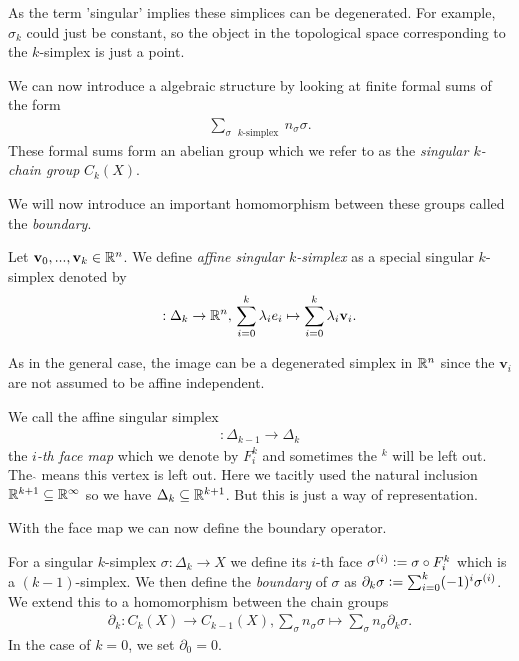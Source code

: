 \documentclass[../master_thesis.tex]{subfiles}
\begin{document}
As the term 'singular' implies these simplices can be degenerated. For example, $\sigma_k$ could 
just be constant, so the object in the topological space corresponding to the 
$k$-simplex is just a point.

We can now introduce a algebraic structure by looking at finite formal sums of the form 
\begin{align*}
    \sum_{\text{$\sigma$ $k$-simplex }} n_\sigma \sigma.
\end{align*}
These formal sums form an abelian group which we refer to as the 
\textit{singular $k$-chain group} $C_k(X)$. 

We will now introduce an important homomorphism between these groups called the \textit{boundary}.
\begin{definition}
    Let $\mathbf{v}_0, ... , \mathbf{v}_k \in \mathbb{R}^n$. 
    We define \textit{affine singular $k$-simplex} as a special singular $k$-simplex denoted by
    \begin{align*}
        [\mathbf{v}_0,...,\mathbf{v}_k]: \Delta_k \rightarrow \real^n, \, 
        \sum\limits_{i = 0}^k \lambda_i e_i \mapsto \sum\limits_{i = 0}^k \lambda_i \mathbf{v}_i.
    \end{align*}
\end{definition}
As in the general case, the image can be a degenerated simplex in $\mathbb{R}^n$ since the 
$\mathbf{v}_i$ are not assumed to be affine independent. 

We call the affine singular simplex 
\begin{align}
    [e_0,...,\hat{e}_i,...,e_k]: \Delta_{k-1} \rightarrow \Delta_k \label{eq:face_map}
\end{align}
the \textit{$i$-th face map} which we denote by $F^k_i$ and sometimes the $^k$ will be left out. 
The $\hat{ }$ means this vertex is left out. Here we tacitly used the 
natural inclusion $\mathbb{R}^{k+1} \subseteq \mathbb{R}^\infty$ so we have 
$\Delta_k \subseteq \mathbb{R}^{k+1}$. But this is just a way of representation.

With the face map we can now define the boundary operator.
\begin{definition}[Boundary]
    For a singular $k$-simplex $\sigma: \Delta_k \rightarrow X$ we define its $i$-th face 
    $\sigma^{(i)} \vcentcolon= \sigma \circ F_i^k$ which is a $(k-1)$-simplex. 
    We then define the \textit{boundary} of $\sigma$ as 
    $\partial_k \sigma \vcentcolon= \sum_{i=0}^k (-1)^i \sigma^{(i)}$. We extend this 
    to a homomorphism between the chain groups
    \begin{align*}
        \partial_k: C_k(X) \rightarrow C_{k-1}(X), 
        \sum_\sigma n_\sigma \sigma \mapsto \sum_\sigma n_\sigma \partial_k \sigma.
    \end{align*}
    In the case of $k=0$, we set $\partial_0 = 0$.
\end{definition}
\end{document}
